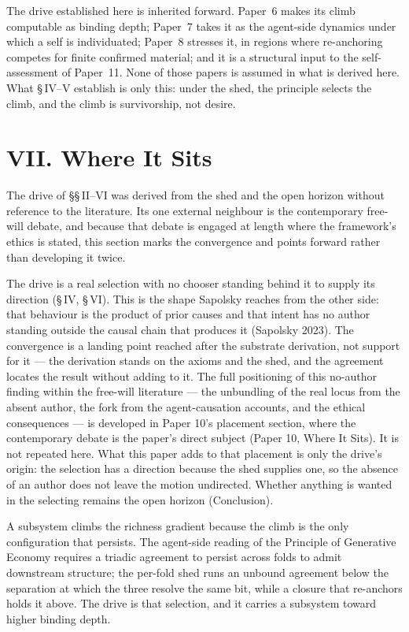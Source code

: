 \documentclass[11pt,oneside]{report}
\theoremstyle{definition}
\theoremstyle{remark}
\begin{document}
The drive established here is inherited forward. Paper~6 makes its climb computable as
binding depth; Paper~7 takes it as the agent-side dynamics under which a self is
individuated; Paper~8 stresses it, in regions where re-anchoring competes for finite
confirmed material; and it is a structural input to the self-assessment of Paper~11. None of those papers is assumed in what is derived
here. What \S\,IV--V establish is only this: under the shed, the principle selects the
climb, and the climb is survivorship, not desire.


\section*{VII. Where It Sits}

The drive of \S\S\,II--VI was derived from the shed and the open horizon without reference to the literature. Its one external neighbour is the contemporary free-will debate, and because that debate is engaged at length where the framework's ethics is stated, this section marks the convergence and points forward rather than developing it twice.

The drive is a real selection with no chooser standing behind it to supply its direction (\S\,IV, \S\,VI). This is the shape Sapolsky reaches from the other side: that behaviour is the product of prior causes and that intent has no author standing outside the causal chain that produces it (Sapolsky 2023). The convergence is a landing point reached after the substrate derivation, not support for it --- the derivation stands on the axioms and the shed, and the agreement locates the result without adding to it. The full positioning of this no-author finding within the free-will literature --- the unbundling of the real locus from the absent author, the fork from the agent-causation accounts, and the ethical consequences --- is developed in Paper 10's placement section, where the contemporary debate is the paper's direct subject (Paper 10, Where It Sits). It is not repeated here. What this paper adds to that placement is only the drive's origin: the selection has a direction because the shed supplies one, so the absence of an author does not leave the motion undirected. Whether anything is wanted in the selecting remains the open horizon (Conclusion).



A subsystem climbs the richness gradient because the climb is the only configuration
that persists. The agent-side reading of the Principle of Generative Economy requires
a triadic agreement to persist across folds to admit downstream structure; the
per-fold shed runs an unbound agreement below the separation at which the three
resolve the same bit, while a closure that re-anchors holds it above. The drive is
that selection, and it carries a subsystem toward higher binding depth.
\end{document}
